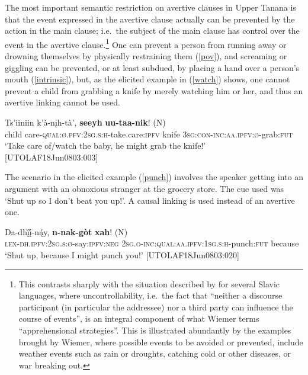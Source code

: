 \documentclass[output=paper,colorlinks,citecolor=brown
]{langscibook}
\begin{document}
The most important semantic restriction on avertive clauses in Upper Tanana is that the event expressed in the avertive clause actually can be prevented by the action in the main clause; i.e.\  the subject of the main clause has control over the event in the avertive clause.\footnote{This contrasts sharply with the situation described by \citet{chapters/wiemer} for several Slavic languages, where uncontrollability, i.e.\  the fact that ``neither a discourse participant (in particular the addressee) nor a third party can influence the course of events'', is an integral component of what Wiemer terms ``apprehensional strategies''. This is illustrated abundantly by the examples brought by Wiemer, where possible events to be avoided or prevented, include weather events such as rain or droughts, catching cold or other diseases, or war breaking out.} One can prevent a person from running away or drowning themselves by physically restraining them (\ref{pov}), and screaming or giggling can be prevented, or at least subdued, by placing a hand over a person's mouth (\ref{intrinsic}), but, as the elicited example in (\ref{watch}) shows, one cannot prevent a child from grabbing a knife by merely watching him or her, and thus an avertive linking cannot be used.

\ea
\label{watch}
\gll Ts'iiniin k'à-nįh-tà', \textbf{seeyh} {\textbf{uu-taa-nik}! \textnormal{(N)}} \\
child care-\textsc{qual:ø.pfv:2sg.s:h}-take.care:\textsc{ipfv} knife \textsc{3sg:con-inc:aa.ipfv:ø}-grab:\textsc{fut} \\
\glt `Take care of/watch the baby, he might grab the knife!' \\ \hfill [UTOLAF18Jun0803:003]
\z 

The scenario in the elicited example (\ref{punch}) involves the speaker getting into an argument with an obnoxious stranger at the grocery store. The cue used was `Shut up so I don't beat you up!'. A causal linking is used instead of an avertive one.

\ea \label{punch}
\gll Da-dhį̀į̀-ną́y, \textbf{n-nak-gòt} {\textbf{xah}! \textnormal{(N)}} \\
\textsc{lex-dh.ipfv:2sg.s:ø}-say:\textsc{ipfv:neg} \textsc{2sg.o-inc:qual:aa.ipfv:1sg.s:h}-punch:\textsc{fut} because \\
\glt `Shut up, because I might punch you!' \hfill [UTOLAF18Jun0803:020]
\z
\end{document}
